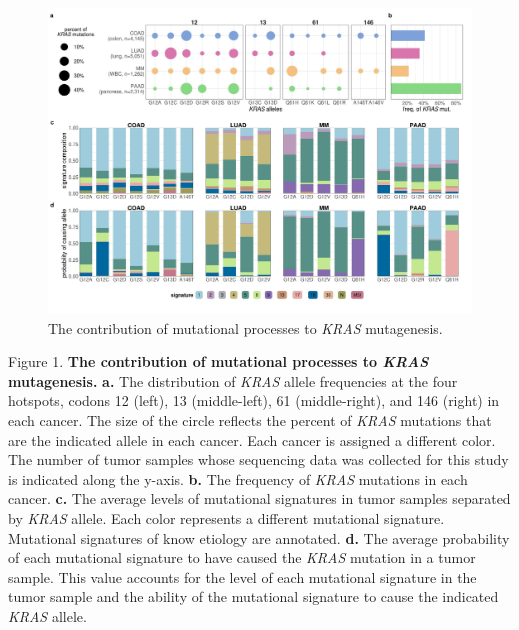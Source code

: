 \documentclass[english, 10pt, letterpaper]{article}
\newcommand{\KRAS}{\emph{KRAS}}
\begin{document}
\begin{figure}[h!]
\centering
\includegraphics[width=180mm]{figures/Fig_1.jpeg}
\caption{The contribution of mutational processes to \KRAS{} mutagenesis.}
\label{fig:mutational-signatures-main}
\end{figure}
\newpage
\newpage
\noindent Figure 1. \textbf{The contribution of mutational processes to \KRAS{} mutagenesis.}
\textbf{a.} The distribution of \KRAS{} allele frequencies at the four hotspots, codons 12 (left), 13 (middle-left), 61 (middle-right), and 146 (right) in each cancer. The size of the circle reflects the percent of \KRAS{} mutations that are the indicated allele in each cancer. Each cancer is assigned a different color. The number of tumor samples whose sequencing data was collected for this study is indicated along the y-axis. 
\textbf{b.} The frequency of \KRAS{} mutations in each cancer.
\textbf{c.} The average levels of mutational signatures in tumor samples separated by \KRAS{} allele. Each color represents a different mutational signature. Mutational signatures of know etiology are annotated.
\textbf{d.} The average probability of each mutational signature to have caused the \KRAS{} mutation in a tumor sample. This value accounts for the level of each mutational signature in the tumor sample and the ability of the mutational signature to cause the indicated \KRAS{} allele.
\newpage
\end{document}
